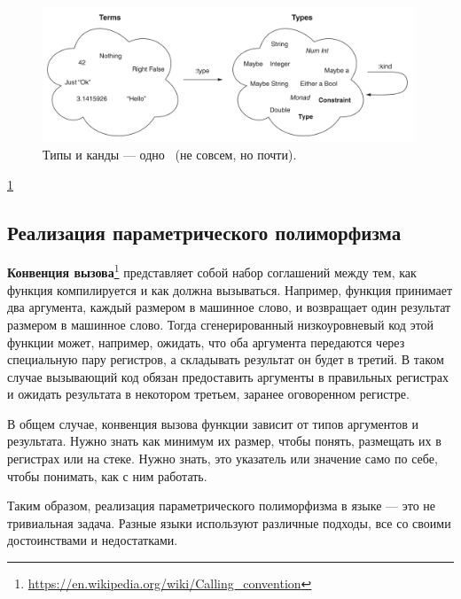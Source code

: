 \documentclass[12pt]{article}
\newcommand{\vocab}[1]{\textbf{#1}} %
\begin{document}
    \begin{figure}
        \centering
        \includegraphics[width=0.99\textwidth]{figs/types-eq-kinds}
        \caption{Типы и канды --- одно~\cite{bragilevsky-haskell} (не совсем, но почти).}
        \label{fig:types-eq-kinds}
    \end{figure}



    \cite{weirich2013system}

    \ref{fig:types-eq-kinds}



    \subsection{Реализация параметрического полиморфизма}

    \vocab{Конвенция вызова}\footnote{\url{https://en.wikipedia.org/wiki/Calling_convention}} представляет собой набор соглашений между тем, как функция компилируется и как должна вызываться.
    Например, функция принимает два аргумента, каждый размером в машинное слово, и возвращает один результат размером в машинное слово.
    Тогда сгенерированный низкоуровневый код этой функции может, например, ожидать, что оба аргумента передаются через специальную пару регистров, а складывать результат он будет в третий.
    В таком случае вызывающий код обязан предоставить аргументы в правильных регистрах и ожидать результата в некотором третьем, заранее оговоренном регистре.

    В общем случае, конвенция вызова функции зависит от типов аргументов и результата.
    Нужно знать как минимум их размер, чтобы понять, размещать их в регистрах или на стеке.
    Нужно знать, это указатель или значение само по себе, чтобы понимать, как с ним работать.

    Таким образом, реализация параметрического полиморфизма в языке --- это не тривиальная задача.
    Разные языки используют различные подходы, все со своими достоинствами и недостатками.
\end{document}
